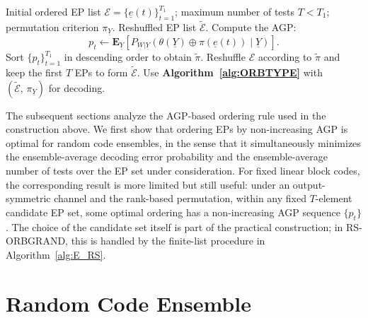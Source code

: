 \documentclass[letterpaper,draftclsnofoot,onecolumn]{IEEEtran}
\begin{document}
\begin{algorithm}[ht]
    \caption{Finite-list construction of $\widetilde{\mathcal{E}}$ for RS-ORBGRAND}
    \label{alg:E_RS}
    \begin{algorithmic}[1]
        \REQUIRE Initial ordered EP list $\mathcal{E}=\{\underline{e}(t)\}_{t=1}^{T_1}$; maximum number of tests $T<T_1$; permutation criterion $\pi_{\underline{Y}}$.
        \ENSURE Reshuffled EP list $\widetilde{\mathcal{E}}$.
            \STATE Compute the AGP:
            \begin{equation}
                p_t \leftarrow \mathbf{E}_{\underline{Y}}\!\left[
                P_{\underline{W}|\underline{Y}}\!\left(
                \theta(\underline{Y}) \oplus \pi(\underline{e}(t)) \mid \underline{Y}
                \right)\right].
            \end{equation}
        \ENDFOR
        \STATE Sort $\{p_t\}_{t=1}^{T_1}$ in descending order to obtain $\widetilde{\pi}$.
        \STATE Reshuffle $\mathcal{E}$ according to $\widetilde{\pi}$ and keep the first $T$ EPs to form $\widetilde{\mathcal{E}}$.
        \STATE Use \textbf{Algorithm~\ref{alg:ORBTYPE}} with $(\widetilde{\mathcal{E}},\, \pi_{\underline{Y}})$ for decoding.
    \end{algorithmic}
\end{algorithm}

The subsequent sections analyze the AGP-based ordering rule used in the construction above. We first show that ordering EPs by non-increasing AGP is optimal for random code ensembles, in the sense that it simultaneously minimizes the ensemble-average decoding error probability and the ensemble-average number of tests over the EP set under consideration. For fixed linear block codes, the corresponding result is more limited but still useful: under an output-symmetric channel and the rank-based permutation, within any fixed $T$-element candidate EP set, some optimal ordering has a non-increasing AGP sequence $\{p_t\}$. The choice of the candidate set itself is part of the practical construction; in RS-ORBGRAND, this is handled by the finite-list procedure in Algorithm~\ref{alg:E_RS}.

\section{Random Code Ensemble} \label{Sec:random_code}
\end{document}
